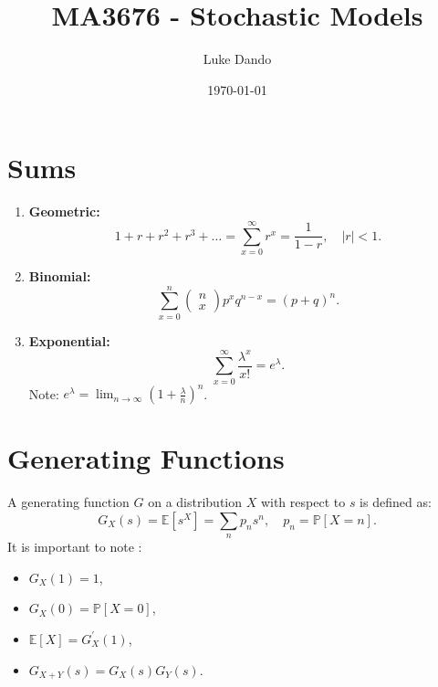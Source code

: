 \documentclass{article}
\title{MA3676 - Stochastic Models}
\author{Luke Dando}
\date{\today}
\begin{document}
\maketitle

\tableofcontents

\section{Sums}

\begin{enumerate}
    \item \textbf{Geometric:} 
    \begin{equation}
        1+r+r^2+r^3+\ldots=\sum_{x=0}^\infty r^x = \frac{1}{1-r},\quad |r|<1.
    \end{equation}
    
    \item \textbf{Binomial:}
    \begin{equation}
        \sum_{x=0}^n \begin{pmatrix} n\\x \end{pmatrix}p^x q^{n-x} = (p+q)^n.
    \end{equation}
    
    \item \textbf{Exponential:}
    \begin{equation}
        \sum_{x=0}^\infty \frac{\lambda^x}{x!}=e^\lambda.
    \end{equation}
    Note: $e^\lambda=\lim_{n\rightarrow\infty}(1+\frac{\lambda}{n})^n$.
\end{enumerate}

\section{Generating Functions}

A generating function $G$ on a distribution $X$ with respect to $s$ is defined as:
\begin{equation}
    G_X(s)=\mathbb{E}[s^X]=\sum_np_ns^n,\quad p_n=\mathbb{P}[X=n].
\end{equation}
It is important to note :
\begin{itemize}
    \item $ G_X(1)=1 $,
    \item $ G_X(0)=\mathbb{P}[X=0]$,
    \item $\mathbb{E}[X]=G_X^\prime(1)$,
    \item $G_{X+Y}(s)=G_X(s)G_Y(s)$.
\end{itemize}
\end{document}
